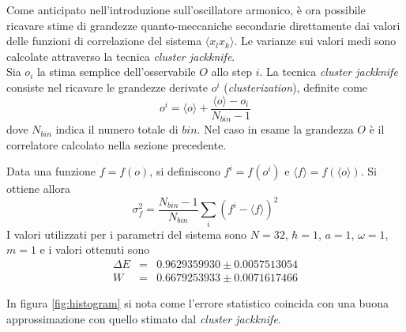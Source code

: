 Come anticipato nell'introduzione sull'oscillatore armonico, è ora possibile ricavare stime di grandezze quanto-meccaniche secondarie direttamente dai valori delle funzioni di correlazione del sistema $\langle x_lx_k\rangle$. Le varianze sui valori medi sono calcolate attraverso la tecnica \textit{cluster jackknife}.
\\

Sia $o_i$ la stima semplice dell'osservabile $O$ allo step $i$. La tecnica \textit{cluster jackknife} consiste nel ricavare le grandezze derivate $o^i$ (\textit{clusterization}), definite come $$o^i=\langle o\rangle+\frac{\langle o\rangle-o_i}{N_{bin}-1}$$ dove $N_{bin}$ indica il numero totale di $bin$. Nel caso in esame la grandezza $O$ è il correlatore calcolato nella sezione precedente.

Data una funzione $f=f(o)$, si definiscono $f^i=f(o^i)$ e $\langle f\rangle=f(\langle o\rangle)$. Si ottiene allora $$\sigma^2_f=\frac{N_{bin}-1}{N_{bin}}\sum\limits_i(f^i-\langle f\rangle)^2$$
I valori utilizzati per i parametri del sistema sono $N=32$, $\hbar=1$, $a=1$, $\omega=1$, $m=1$ e i valori ottenuti sono
\begin{eqnarray*}
\Delta E&=&0.9629359930\pm0.0057513054\\
W&=&0.6679253933\pm0.0071617466
\end{eqnarray*}

In figura \ref{fig:histogram} si nota come l'errore statistico coincida con una buona approssimazione con quello stimato dal \textit{cluster jackknife}.

